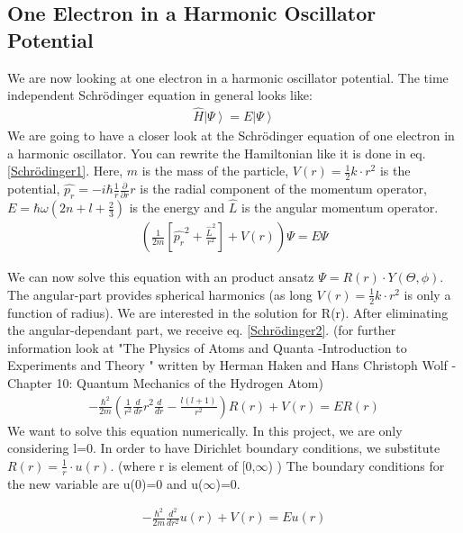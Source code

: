 \documentclass[10pt,a4paper]{article}
\begin{document}
\subsection{One Electron in a Harmonic Oscillator Potential \label{one electron in harm osc}}
We are now looking at one electron in a harmonic oscillator potential. 
The time independent Schrödinger equation in general looks like:
\begin{align}
	\hat{H} \left|\Psi \right> = E \left|\Psi \right>
\end{align}
We are going to have a closer look at the Schrödinger equation of one electron in a harmonic oscillator. 
You can rewrite the Hamiltonian like it is done in eq. \eqref{Schrödinger1}. Here, $m$ is the mass of the particle, $V(r)=\frac{1}{2}k \cdot r^2$ is the potential, $\hat{p_r}=-i \hbar \frac{1}{r} \frac{\partial}{\partial r} r$ is the radial component of the momentum operator, $E=\hbar \omega (2n+l+\frac{2}{3})$ is the energy and $\hat{L}$ is the angular momentum operator. 
\begin{align}
	\left( \frac{1}{2m} \left[ \hat{p_r}^2 + \frac{\hat{L}^2}{r^2}\right] +V(r) \right) \Psi = E \Psi \label{Schrödinger1}
\end{align}

We can now solve this equation with an product ansatz $\Psi= R(r) \cdot Y(\Theta, \phi )$. The angular-part provides spherical harmonics (as long $V(r)=\frac{1}{2}k \cdot r^2$ is only a function of radius). We are interested in the solution for R(r). After eliminating the angular-dependant part, we receive eq. \eqref{Schrödinger2}. (for further information look at "The Physics of Atoms and Quanta -Introduction to Experiments and Theory " written by Herman Haken and Hans Christoph Wolf - Chapter 10: Quantum Mechanics of the Hydrogen Atom)
\begin{align}
	-\frac{\hbar^2}{2 m} \left( \frac{1}{r^2} \frac{d}{dr}r^2 \frac{d}{dr}-\frac{l(l+1)}{r^2} \right) R(r)+ V(r) = E R(r) \label{Schrödinger2}
\end{align}
We want to solve this equation numerically. In this project, we are only considering l=0.
In order to have Dirichlet boundary conditions, we substitute $R(r)=\frac{1}{r}\cdot u(r)$. (where r is element of [0,$\infty$)  ) The boundary conditions for the new variable are u(0)=0 and u($\infty$)=0. 

\begin{align}
	-\frac{\hbar^2}{2 m}  \frac{d^2}{dr^2} u(r)+ V(r) = E u(r) \label{Schrödinger3}
\end{align}
\end{document}
